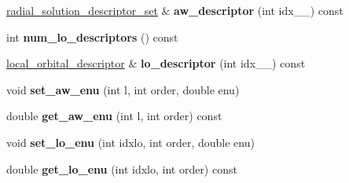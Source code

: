 \begin{DoxyCompactItemize}
\item 
\hypertarget{classsirius_1_1_atom__symmetry__class_acabbb4ddd23092fcefe19d32f8976900}{}\hyperlink{descriptors_8h_aec4b6e691d842d5c6b06552800a478b3}{radial\+\_\+solution\+\_\+descriptor\+\_\+set} \& {\bfseries aw\+\_\+descriptor} (int idx\+\_\+\+\_\+) const \label{classsirius_1_1_atom__symmetry__class_acabbb4ddd23092fcefe19d32f8976900}

\item 
\hypertarget{classsirius_1_1_atom__symmetry__class_aa91d65ec9fdc8f8b601fa1ff2332d2f2}{}int {\bfseries num\+\_\+lo\+\_\+descriptors} () const \label{classsirius_1_1_atom__symmetry__class_aa91d65ec9fdc8f8b601fa1ff2332d2f2}

\item 
\hypertarget{classsirius_1_1_atom__symmetry__class_ac64e8ab314a97e34b0b3a84b6550c298}{}\hyperlink{structlocal__orbital__descriptor}{local\+\_\+orbital\+\_\+descriptor} \& {\bfseries lo\+\_\+descriptor} (int idx\+\_\+\+\_\+) const \label{classsirius_1_1_atom__symmetry__class_ac64e8ab314a97e34b0b3a84b6550c298}

\item 
\hypertarget{classsirius_1_1_atom__symmetry__class_ac3d381672789f0aabc618dfe72936a8a}{}void {\bfseries set\+\_\+aw\+\_\+enu} (int l, int order, double enu)\label{classsirius_1_1_atom__symmetry__class_ac3d381672789f0aabc618dfe72936a8a}

\item 
\hypertarget{classsirius_1_1_atom__symmetry__class_afb83e01bafb4185182174a0cca786a35}{}double {\bfseries get\+\_\+aw\+\_\+enu} (int l, int order) const \label{classsirius_1_1_atom__symmetry__class_afb83e01bafb4185182174a0cca786a35}

\item 
\hypertarget{classsirius_1_1_atom__symmetry__class_a3565f0b8f021e490738342b0ea286a5a}{}void {\bfseries set\+\_\+lo\+\_\+enu} (int idxlo, int order, double enu)\label{classsirius_1_1_atom__symmetry__class_a3565f0b8f021e490738342b0ea286a5a}

\item 
\hypertarget{classsirius_1_1_atom__symmetry__class_a2f07ad3159025333e903a1421160e521}{}double {\bfseries get\+\_\+lo\+\_\+enu} (int idxlo, int order) const \label{classsirius_1_1_atom__symmetry__class_a2f07ad3159025333e903a1421160e521}

\end{DoxyCompactItemize}
